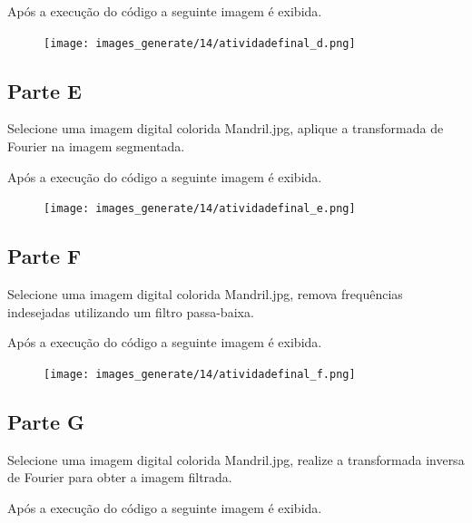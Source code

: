 \documentclass[10pt,a4paper]{article}
\begin{document}


Após a execução do código a seguinte imagem é exibida.

\begin{figure}[H]
    \centering
    {{\texttt{[image: images\_generate/14/atividadefinal\_d.png]}}}
\end{figure}


\subsection{Parte E}

Selecione uma imagem digital colorida Mandril.jpg, aplique a transformada de Fourier na imagem segmentada. 



Após a execução do código a seguinte imagem é exibida.

\begin{figure}[H]
    \centering
    {{\texttt{[image: images\_generate/14/atividadefinal\_e.png]}}}
\end{figure}


\subsection{Parte F}

Selecione uma imagem digital colorida Mandril.jpg, remova frequências indesejadas utilizando um filtro passa-baixa. 



Após a execução do código a seguinte imagem é exibida.

\begin{figure}[H]
    \centering
    {{\texttt{[image: images\_generate/14/atividadefinal\_f.png]}}}
\end{figure}


\subsection{Parte G}

Selecione uma imagem digital colorida Mandril.jpg, realize a transformada inversa de Fourier para obter a imagem filtrada.



Após a execução do código a seguinte imagem é exibida.
\end{document}
